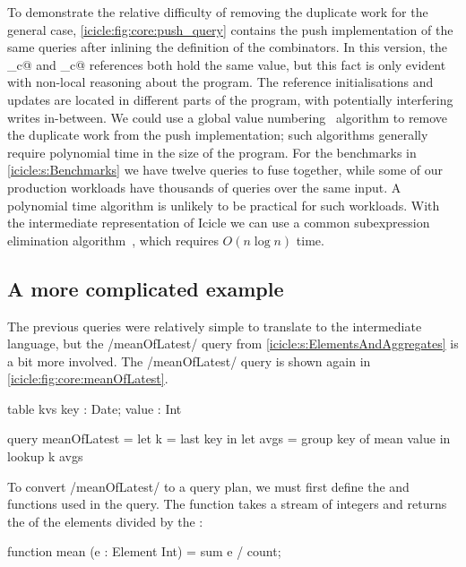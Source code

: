 To demonstrate the relative difficulty of removing the duplicate work for the general case, \cref{icicle:fig:core:push_query} contains the push implementation of the same queries after inlining the definition of the combinators.
In this version, the \IcC@more_c@ and \IcC@mean_c@ references both hold the same value, but this fact is only evident with non-local reasoning about the program.
The reference initialisations and updates are located in different parts of the program, with potentially interfering writes in-between.
We could use a global value numbering~\citep{gulwani2004polynomial} algorithm to remove the duplicate work from the push implementation; such algorithms generally require polynomial time in the size of the program.
For the benchmarks in \cref{icicle:s:Benchmarks} we have twelve queries to fuse together, while some of our production workloads have thousands of queries over the same input.
A polynomial time algorithm is unlikely to be practical for such workloads.
With the intermediate representation of Icicle we can use a common subexpression elimination algorithm~\cite{chitil1997common}, which requires $O(n \log n)$ time.

\subsection{A more complicated example}

The previous queries were relatively simple to translate to the intermediate language, but the \Hs/meanOfLatest/ query from \cref{icicle:s:ElementsAndAggregates} is a bit more involved.
The \Hs/meanOfLatest/ query is shown again in \cref{icicle:fig:core:meanOfLatest}.

\begin{icicle}[float,caption=Icicle implementation of \Hs/meanOfLatest/ (repeated),label=icicle:fig:core:meanOfLatest]
table kvs { key : Date; value : Int } 

query meanOfLatest
 = let k    = last  key in
   let avgs = group key of mean value in
   lookup k avgs
\end{icicle}

To convert \Hs/meanOfLatest/ to a query plan, we must first define the \IcC@mean@ and \IcC@last@ functions used in the query.
The \IcC@mean@ function takes a stream of integers and returns the \IcC@sum@ of the elements divided by the \IcC@count@:
\begin{icicle}
function mean (e : Element Int)
 = sum e / count;
\end{icicle}


